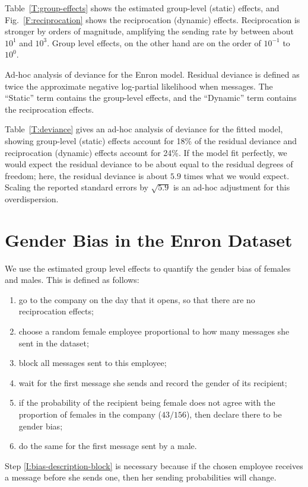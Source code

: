 \documentclass[aoas,preprint]{imsart}
\begin{document}
Table~\ref{T:group-effects} shows the estimated group-level
(static) effects, and Fig.~\ref{F:reciprocation} shows the reciprocation
(dynamic) effects.  Reciprocation is stronger by orders of magnitude,
amplifying the sending rate by between about $10^1$ and $10^3$.  Group level
effects, on the other hand are on the order of $10^{-1}$ to $10^0$.

\begin{table}[h]
    
    \caption{
        Ad-hoc analysis of deviance for the Enron model.  Residual deviance
        is defined as twice the approximate negative log-partial likelihood
        when messages.  The ``Static'' term contains the group-level effects,
        and the ``Dynamic'' term contains the reciprocation effects.
    }
    \label{T:deviance}
\end{table}

Table~\ref{T:deviance} gives an ad-hoc analysis of deviance for the fitted
model, showing group-level (static) effects account for 18\% of the
residual deviance and reciprocation (dynamic) effects account for 24\%.
If the model fit perfectly, we would expect the residual deviance to be
about equal to the residual degrees of freedom; here, the residual deviance
is about $5.9$ times what we would expect.  Scaling the reported standard errors
by $\sqrt{5.9}$ is an ad-hoc adjustment for this overdispersion.


\section{Gender Bias in the Enron Dataset}

We use the estimated group level effects to quantify the gender bias of
females and males.  This is defined as follows:
\begin{enumerate}
    \item go to the company on the day that it opens, so that there are no
          reciprocation effects;
    \item choose a random female employee proportional to how many
          messages she sent in the dataset;
    \item \label{I:bias-description-block}
          block all messages sent to this employee;
    \item wait for the first message she sends and record the gender
          of its recipient;
    \item if the probability of the recipient being female does not
          agree with the proportion of females in the company ($43 / 156$),
          then declare there to be gender bias;
    \item do the same for the first message sent by a male.
\end{enumerate}
Step \ref{I:bias-description-block} is necessary because if the chosen
employee receives a message before she sends one, then her sending
probabilities will change.  
\end{document}
